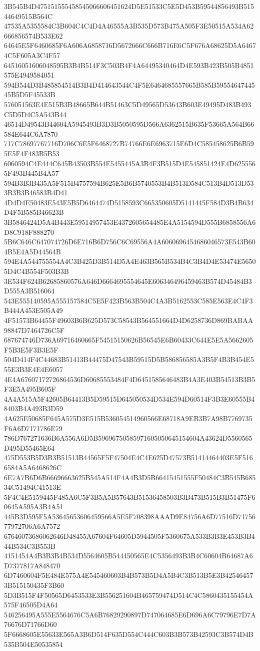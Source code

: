{{{{{{{{{{{{{{{{{{{{{3B545B4D475151555458545066606451624D5E51533C5E5D453B59544856493B51544649515B564C
47535A5355584C3B604C4C4D4A46555A3B535D573B475A505F3E50515A534A62666856574B533E62
64645E5F6460685F6A606A6858716D5672666C666B716E6C5F676A68625D5A64674C5F605A3C4F57
64516051606048595B3B4B514F3C503B4F4A64495340464D4E593B423B505B4851575E4949584051
594B544D3B485854514B3B4D414643544C4F5E6464685557665B585B5955464744545B5D5F45533B
576051563E4E515B3B48665B644B51463C5D49565D53643B603E49495D483B493C5D5D4C5A543B44
46514D49543B44604A5945493B3D3B5050595D566A6362515B635F53665A564B66584E644C6A7870
717C78697767716D706C6E5F6468727B74766E6E6963715E6D4C585458625B6B595E5F4F483B5B53
6060594C4E444C645B43503B554E5455445A3B4F3B515D4E545851424E4D6255565F493B445B4A57
594B3B3B435A5F515B4757594B625E5B6B5740553B4B513D584C513B4D513D533B3B3B46583B4D41
4D4D4E50483E543E5B5D6464474D5158593C665350605D5141445F584D3B4B634D4F5B585B46623B
3B5846424D5A4B443E59514957453E4372605654485E4A5154594D555B6858556A6D8C918F888270
5B6C646C647074726D6E716B6D756C6C69556A4A6060696454686046573E543B604B5E4A5D44564B
594E4A544755554A4C3B425D3B514D5A4E463B565B534B4C3B4D4E53474E56505D4C4B554F503B3B
3E534F624B62685860576A646D6664695554645E606346496459463B574D45484B3D555A3B516064
543E555140595A555157584C5E5F423B563B504C4A3B5162553C585E563E4C4F3B444A453E505A49
4F51573B64455F49603B6B625D573C58543B564551664D4D6258736D869BABAA98847D7464726C5F
687674746D736A69716460665F54515150626B56545E6B60433C644E5E5A5662605F5B3E5F3B3E5F
504D414F4C44683B51413B44475D47543B59515D5B586856585A3B5F4B3B454E555E3B3E4E4E6057
4E4A67607172726864536D60685553484F4D6451585646483B4A3E403B54513B3B5F3E5A495B605F
4A4A515A5F42605B64413B5D59515D645050534D534E594D60514F3B3E60555B48403B4A493B3D59
4A625E50685F645A575D3E515B536054514960566E68718A9EB3B7A98B7769735F6A6D7171786E79
786D767271636B6A556A6D5B59696750585971605050645154604A43624D5560565D495D55465E64
475D553B5D3B3B51513B44565F5F47504E4C4E625D47573B51414464403E5F5166584A5A6468626C
6E7A7B6D6B66696663625B545A514F4A4B3D5B66415451555F50484C3B545B68534C51494C41513E
5F4C4E5159445F485A6C5F3B5A5B57643B51536458503B3B473B515B3B51475F60645A595A3B4A51
445B3D595F5A53645653606459566A5E5F708398AAAD9E84756A6D77516D7175677972706A6A7572
67646073686062646D48455A67604F64605D5944505F5360675A533B3B3E453B3B444B534C3B553B
4151454A4B3B3B4B534D5564605B544450565E4C5356493B3B4C60604B64687A6D7377817A848470
6D7460604F5E484E575A4E545460603B4B573B5D4A5B4C3B513B5E3B425464573B515150435F3B60
5D3B515F4F50565D6453533E3B556251604B465759474D514C4C5860435155454A575F46505D4A64
546256495A555E5564676C5A6B76829290897D747064685E6D696A6C79796E7D7A76676D71766D60
5F6668605E55633E565A3B6D514F635D554C444C603B3B573B42593C3B574D4B535B504E50535854
}}}}}}}}}}}}}}}}}}}}}

